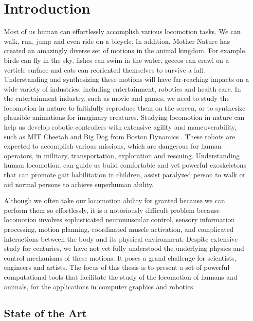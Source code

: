 \chapter{Introduction}

Most of us human can effortlessly accomplish various locomotion tasks. We can walk, run, jump and even ride on a bicycle. In addition, Mother Nature has created an amazingly diverse set of motions in the animal kingdom. For example, birds can fly in the sky, fishes can swim in the water, geccos can crawl on a verticle surface and cats can reoriented themselves to survive a fall. Understanding and synthesizing these motions will have far-reaching impacts on a wide variety of industries, including entertainment, robotics and health care. In the entertainment industry, such as movie and games, we need to study the locomotion in nature to faithfully reproduce them on the screen, or to synthesize plausible animations for imaginary creatures. Studying  locomotion in nature can help us develop robotic controllers with extensive agility and maneuverability, such as MIT Cheetah \cite{} and Big Dog from Boston Dynamics \cite{}. These robots are expected to accomplish various missions, which are dangerous for human operators, in military, transportation, exploration and rescuing. Understanding human locomotion, can guide us build comfortable and yet powerful exoskeletons that can promote gait habilitation in children, assist paralyzed person to walk or aid normal persons to achieve superhuman ability.

Although we often take our locomotion ability for granted because we can perform them so effortlessly, it is a notoriously difficult problem because locomotion involves sophisticated neuromuscular control, sensory information processing, motion planning, coordinated muscle activation, and complicated interactions between the body and its physical environment. Despite extensive study for centuries, we have not yet fully understood the underlying physics and control mechanisms of these motions. It poses a grand challenge for scientists, engineers and artists. The focus of this thesis is to present a set of powerful computational tools that facilitate the study of the locomotion of humans and animals, for the applications in computer graphics and robotics.

\section{State of the Art}

